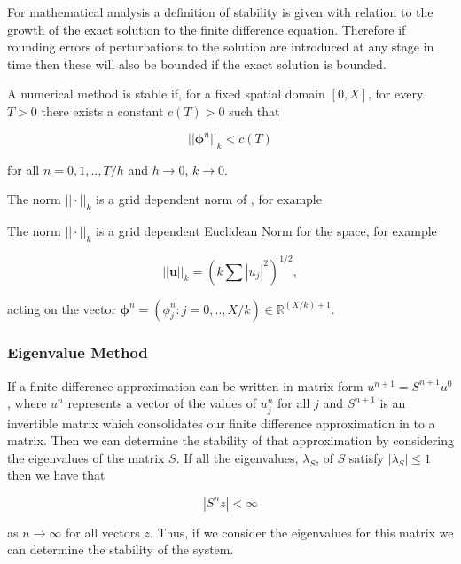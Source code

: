 \documentclass[../main.tex]{subfiles}
\begin{document}
  For mathematical analysis a definition of stability is given with relation to the growth of the exact solution to the finite difference equation. Therefore if rounding errors of perturbations to the solution are introduced at any stage in time then these will also be bounded if the exact solution is bounded.

  \begin{definition}
    A numerical method is stable if, for a fixed spatial domain $[0, X]$, for every $T > 0$ there exists a constant $c(T) > 0$ such that

    \begin{equation}
      || \boldsymbol\phi^n ||_k < c(T)
    \end{equation}

    for all $n = 0, 1, .. , T / h$ and $h \to 0$, $k \to 0$.
  \end{definition}

  The norm $|| \cdot ||_k$ is a grid dependent norm of , for example

  The norm $|| \cdot ||_k$ is a grid dependent Euclidean Norm for the space, for example

  $$
    || \mathbf{u} ||_k = \left( k \sum |u_j|^2 \right)^{1/2},
  $$

  acting on the vector $\boldsymbol\phi^n = (\phi^n_j : j = 0, .. , X / k) \in \mathbb{R}^{(X / k) + 1}$.

  \subsubsection{Eigenvalue Method}
  If a finite difference approximation can be written in matrix form $u^{n+1} = S^{n+1} u^0$, where $u^n$ represents a vector of the values of $u^n_j$ for all $j$ and $S^{n+1}$ is an invertible matrix which consolidates our finite difference approximation in to a matrix. Then we can determine the stability of that approximation by considering the eigenvalues of the matrix $S$. If all the eigenvalues, $\lambda_S$, of $S$ satisfy $| \lambda_S | \leq 1$ then we have that

  \begin{equation}
    |S^n z | < \infty
  \end{equation}

  as $n \to \infty$ for all vectors $z$. Thus, if we consider the eigenvalues for this matrix we can determine the stability of the system.
\end{document}
